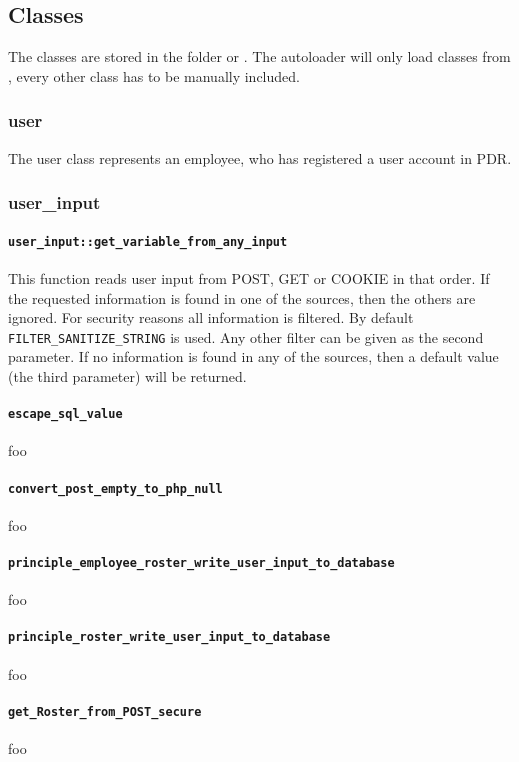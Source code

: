\subsection{Classes}
The classes are stored in the folder  or .
The autoloader will only load classes from , every other class has to be manually included.

\subsubsection{user}
The user class represents an employee, who has registered a user account in PDR.

\subsubsection{user\_input}
\paragraph{\lstinline|user_input::get_variable_from_any_input|}
This function reads user input from POST, GET or COOKIE in that order.
If the requested information is found in one of the sources, then the others are ignored.
For security reasons all information is filtered. By default \lstinline|FILTER_SANITIZE_STRING| is used. Any other filter can be given as the second parameter.
If no information is found in any of the sources, then a default value (the third parameter) will be returned.

\paragraph{\lstinline|escape_sql_value|} foo
\paragraph{\lstinline|convert_post_empty_to_php_null|} foo
\paragraph{\lstinline|principle_employee_roster_write_user_input_to_database|} foo
\paragraph{\lstinline|principle_roster_write_user_input_to_database|} foo
\paragraph{\lstinline|get_Roster_from_POST_secure|} foo
